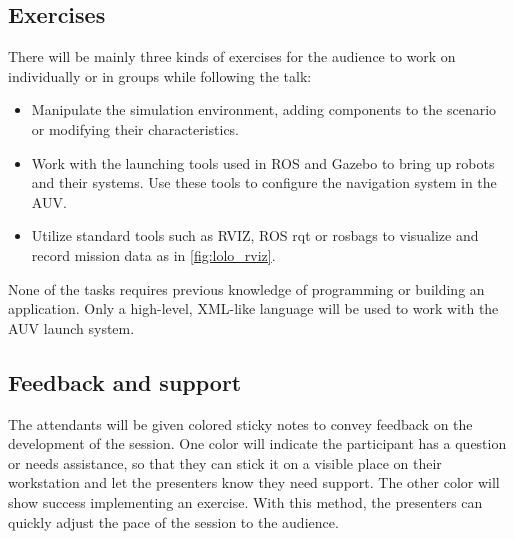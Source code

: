 \documentclass[
10pt, %
a4paper, %
oneside, %
headinclude,footinclude, %
BCOR5mm, %
]{scrartcl}
\begin{document}
\subsection{\textbf{Exercises}}
There will be mainly three kinds of exercises for the audience to work on individually or in groups while following the talk:

\begin{itemize}
	\item Manipulate the simulation environment, adding components to the scenario or modifying their characteristics.
	\item Work with the launching tools used in ROS and Gazebo to bring up robots and their systems. 
	Use these tools to configure the navigation system in the AUV.
	\item Utilize standard tools such as RVIZ, ROS rqt or rosbags to visualize and record mission data as in \ref{fig:lolo_rviz}.
\end{itemize}

None of the tasks requires previous knowledge of programming or building an application.
Only a high-level, XML-like language will be used to work with the AUV launch system.

\subsection{\textbf{Feedback and support}}
The attendants will be given colored sticky notes to convey feedback on the development of the session. 
One color will indicate the participant has a question or needs assistance, so that they can stick it on a visible place on their workstation and let the presenters know they need support.
The other color will show success implementing an exercise.
With this method, the presenters can quickly adjust the pace of the session to the audience.



\end{document}
